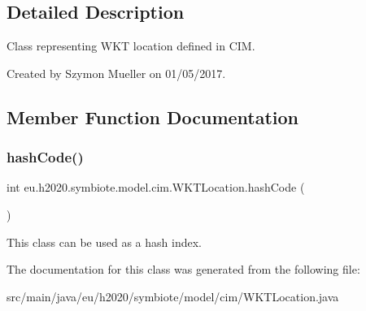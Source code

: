 \subsection{Detailed Description}
Class representing W\+KT location defined in C\+IM.

Created by Szymon Mueller on 01/05/2017. 

\subsection{Member Function Documentation}
\mbox{\label{classeu_1_1h2020_1_1symbiote_1_1model_1_1cim_1_1WKTLocation_ae40b93be056d75c23dbd943bbf6bb27d}} 
\subsubsection{\texorpdfstring{hash\+Code()}{hashCode()}}
{\footnotesize\ttfamily int eu.\+h2020.\+symbiote.\+model.\+cim.\+W\+K\+T\+Location.\+hash\+Code (\begin{DoxyParamCaption}{ }\end{DoxyParamCaption})}

This class can be used as a hash index. 

The documentation for this class was generated from the following file\+:\begin{DoxyCompactItemize}
\item 
src/main/java/eu/h2020/symbiote/model/cim/W\+K\+T\+Location.\+java\end{DoxyCompactItemize}

